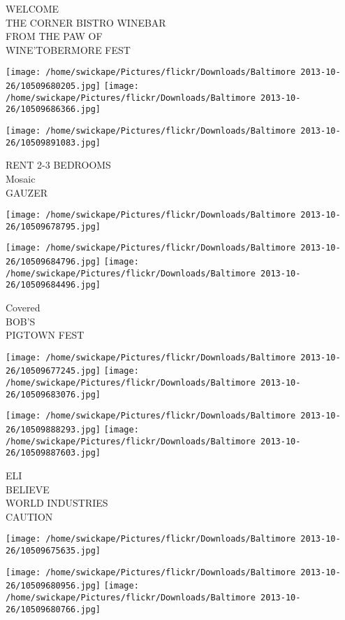 \documentclass[10pt,letterpaper]{article}
\begin{document}
WELCOME\\
THE CORNER BISTRO WINEBAR\\
FROM THE PAW OF\\
WINE'TOBERMORE FEST\\
\pagebreak

\texttt{[image: /home/swickape/Pictures/flickr/Downloads/Baltimore 2013-10-26/10509680205.jpg]}
\texttt{[image: /home/swickape/Pictures/flickr/Downloads/Baltimore 2013-10-26/10509686366.jpg]}

\texttt{[image: /home/swickape/Pictures/flickr/Downloads/Baltimore 2013-10-26/10509891083.jpg]}

RENT 2{-}3 BEDROOMS\\
Mosaic\\
GAUZER\\
\pagebreak

\texttt{[image: /home/swickape/Pictures/flickr/Downloads/Baltimore 2013-10-26/10509678795.jpg]}

\vspace{0.25in}
\texttt{[image: /home/swickape/Pictures/flickr/Downloads/Baltimore 2013-10-26/10509684796.jpg]}
\texttt{[image: /home/swickape/Pictures/flickr/Downloads/Baltimore 2013-10-26/10509684496.jpg]}

Covered\\
BOB'S\\
PIGTOWN FEST\\
\pagebreak

\texttt{[image: /home/swickape/Pictures/flickr/Downloads/Baltimore 2013-10-26/10509677245.jpg]}
\texttt{[image: /home/swickape/Pictures/flickr/Downloads/Baltimore 2013-10-26/10509683076.jpg]}

\texttt{[image: /home/swickape/Pictures/flickr/Downloads/Baltimore 2013-10-26/10509888293.jpg]}
\texttt{[image: /home/swickape/Pictures/flickr/Downloads/Baltimore 2013-10-26/10509887603.jpg]}

ELI\\
BELIEVE\\
WORLD INDUSTRIES\\
CAUTION\\
\pagebreak

\texttt{[image: /home/swickape/Pictures/flickr/Downloads/Baltimore 2013-10-26/10509675635.jpg]}

\vspace{0.25in}
\texttt{[image: /home/swickape/Pictures/flickr/Downloads/Baltimore 2013-10-26/10509680956.jpg]}
\texttt{[image: /home/swickape/Pictures/flickr/Downloads/Baltimore 2013-10-26/10509680766.jpg]}
\end{document}

